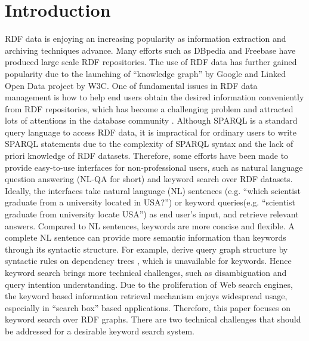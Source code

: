 \section{Introduction} \label{sec:introduction}

RDF data is enjoying an increasing popularity as information extraction and archiving techniques advance. Many efforts such as DBpedia \cite{lehmann2015dbpedia} and Freebase \cite{bollacker2008freebase} have produced large scale RDF repositories. The use of RDF data has further gained popularity due to the launching of ``knowledge graph'' by Google and Linked Open Data project by W3C. One of fundamental issues in RDF data management is how to help end users obtain the desired information conveniently from RDF repositories, which has become a challenging problem and attracted lots of attentions in the database community . Although SPARQL is a standard query language to access RDF data, it is impractical for ordinary users to write SPARQL statements due to the complexity of SPARQL syntax and the lack of priori knowledge of RDF datasets.
Therefore, some efforts have been made to provide easy-to-use interfaces for non-professional users, such as natural language question answering (NL-QA for short) \cite{unger2012template,yahya2012natural,zou2014natural} and keyword search \cite{tran2009top,pound2012interpreting,le2014scalable} over RDF datasets. Ideally, the interfaces take natural language (NL) sentences (e.g. ``which scientist graduate from a university located in USA?'') or keyword queries(e.g. ``scientist graduate from university locate USA'') as end user's input, and retrieve relevant answers. Compared to NL sentences, keywords are more concise and flexible. A complete NL sentence can provide more semantic information than keywords through its syntactic structure. For example, \cite{yahya2012natural,zou2014natural} derive query graph structure by syntactic rules on dependency trees \cite{de2008stanford}, which is unavailable for keywords. Hence keyword search brings more technical challenges, such as disambiguation and query intention understanding. Due to the proliferation of Web search engines, the keyword based information retrieval mechanism enjoys widespread usage, especially in ``search box'' based applications. Therefore, this paper focuses on keyword search over RDF graphs. There are two technical challenges that should be addressed for a desirable keyword search system.  

